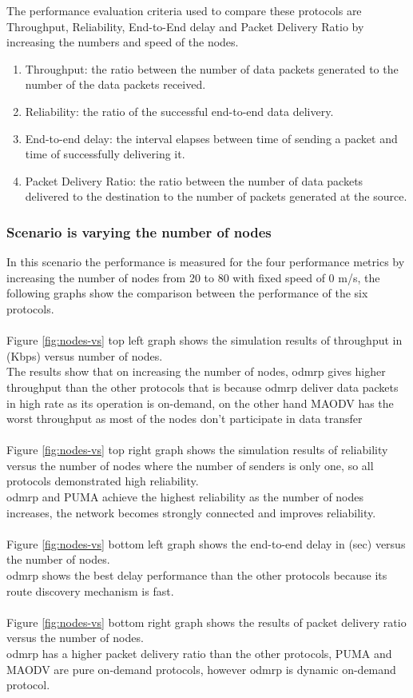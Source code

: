 The performance evaluation criteria used to compare these protocols are Throughput, Reliability, End-to-End delay and Packet Delivery Ratio by increasing the numbers and speed of the nodes.

\begin{enumerate}[itemsep=1pt, topsep=5pt]
    \item Throughput: the ratio between the number of data packets generated to the number of the data packets received.
    \item Reliability: the ratio of the successful end-to-end data delivery.
    \item End-to-end delay: the interval elapses between time of sending a packet and time of successfully delivering it.
    \item Packet Delivery Ratio: the ratio between the number of data packets delivered to the destination to the number of packets generated at the source.
\end{enumerate}

\subsubsection{Scenario is varying the number of nodes}
In this scenario the performance is measured for the four performance metrics by increasing the number of nodes from 20 to 80 with fixed speed of 0 m/s, the following graphs show the comparison between the performance of the six protocols.
\\
\\
Figure \ref{fig:nodes-vs} top left graph shows the simulation results of throughput in (Kbps) versus number of nodes.
\\
The results show that on increasing the number of nodes, \acrshort{odmrp} gives higher throughput than the other protocols that is because \acrshort{odmrp} deliver data packets in high rate as its operation is on-demand, on the other hand MAODV has the worst throughput as most of the nodes don’t participate in data transfer
\\
\\
Figure \ref{fig:nodes-vs} top right graph shows the simulation results of reliability versus the number of nodes where the number of senders is only one, so all protocols demonstrated high reliability.
\\
\acrshort{odmrp} and PUMA achieve the highest reliability as the number of nodes increases, the network becomes strongly connected and improves reliability.
\\
\\
Figure \ref{fig:nodes-vs} bottom left graph shows the end-to-end delay in (sec) versus the number of nodes.
\\
\acrshort{odmrp} shows the best delay performance than the other protocols because its route discovery mechanism is fast.
\\
\\
Figure \ref{fig:nodes-vs} bottom right graph shows the results of packet delivery ratio versus the number of nodes.
\\
\acrshort{odmrp} has a higher packet delivery ratio than the other protocols, PUMA and MAODV are pure on-demand protocols, however \acrshort{odmrp} is dynamic on-demand protocol.

